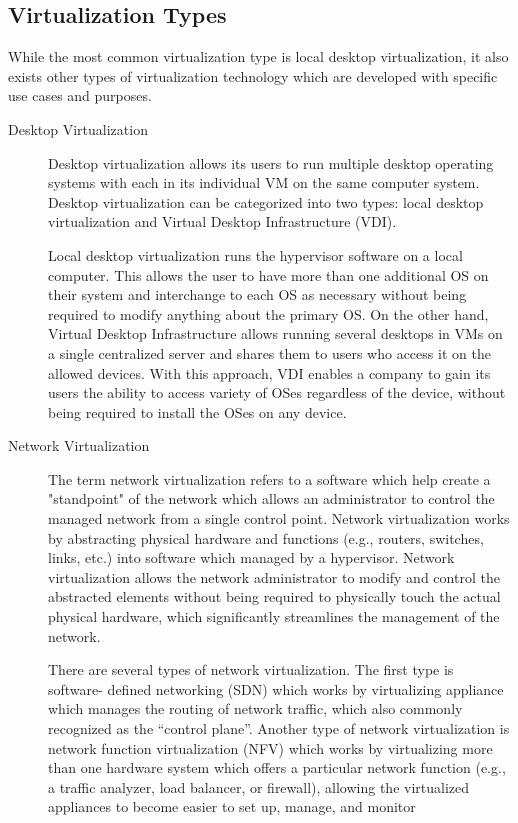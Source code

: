 \documentclass[../index.tex]{subfiles}
\begin{document}
\subsection{Virtualization Types}

While the most common virtualization type is local desktop virtualization, it also exists other
types of virtualization technology which are developed with specific use cases and purposes.

\begin{description}

	\item[Desktop Virtualization] Desktop virtualization allows its users to run multiple desktop
		operating systems with each in its individual VM on the same computer system. Desktop
		virtualization can be categorized into two types: local desktop virtualization and Virtual
		Desktop Infrastructure (VDI).

		Local desktop virtualization runs the hypervisor software on a local computer. This allows the
		user to have more than one additional OS on their system and interchange to each OS as necessary
		without being required to modify anything about the primary OS. On the other hand, Virtual
		Desktop Infrastructure allows running several desktops in VMs on a single centralized server and
		shares them to users who access it on the allowed devices. With this approach, VDI enables a
		company to gain its users the ability to access variety of OSes regardless of the device,
		without being required to install the OSes on any device.

	\item[Network Virtualization] The term network virtualization refers to a software which help
		create a "standpoint" of the network which allows an administrator to control the managed
		network from a single control point. Network virtualization works by abstracting physical
		hardware and functions (e.g., routers, switches, links, etc.) into software which managed by a
		hypervisor. Network virtualization allows the network administrator to modify and control the
		abstracted elements without being required to physically touch the actual physical hardware,
		which significantly streamlines the management of the network.

		There are several types of network virtualization. The first type is software- defined
		networking (SDN) which works by virtualizing appliance which manages the routing of network
		traffic, which also commonly recognized as the “control plane”. Another type of network
		virtualization is network function virtualization (NFV) which works by virtualizing more than
		one hardware system which offers a particular network function (e.g., a traffic analyzer, load
		balancer, or firewall), allowing the virtualized appliances to become easier to set up, manage,
		and monitor


\end{description}
\end{document}
